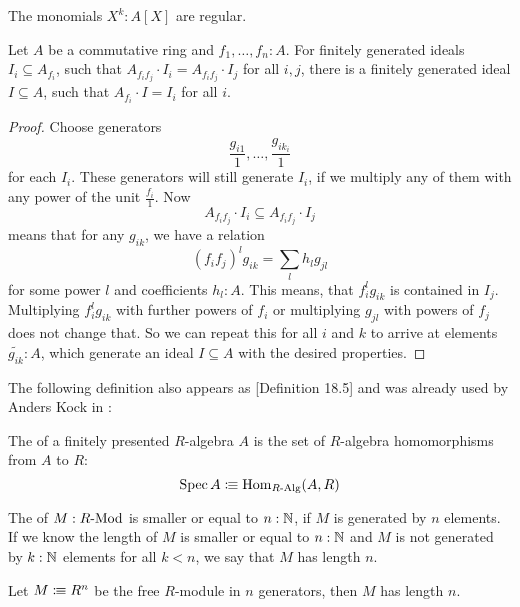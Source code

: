 \begin{example}
  The monomials $X^k:A[X]$ are regular.
\end{example}

\begin{lemma}%
  \label{fg-ideal-local-global}
  Let $A$ be a commutative ring and $f_1,\dots,f_n:A$.
  For finitely generated ideals $I_i\subseteq A_{f_i}$,
  such that $A_{f_if_j}\cdot I_i=A_{f_if_j}\cdot I_j$ for all $i,j$,
  there is a finitely generated ideal $I\subseteq A$,
  such that $A_{f_i}\cdot I=I_i$ for all $i$.
\end{lemma}

\begin{proof}
  Choose generators 
  \[ \frac{g_{i1}}{1},\dots,\frac{g_{ik_i}}{1} \]
  for each $I_i$.
  These generators will still generate $I_i$, if we multiply any of them with any power of the unit $\frac{f_i}{1}$.
  Now
  \[ A_{f_if_j}\cdot I_i\subseteq A_{f_if_j}\cdot I_j \]
  means that for any $g_{ik}$, we have a relation
  \[ (f_if_j)^l g_{ik}=\sum_{l}h_{l}g_{jl}\]
  for some power $l$ and coefficients $h_{l}:A$.
  This means, that $f_i^lg_{ik}$ is contained in $I_j$.
  Multiplying $f_i^lg_{ik}$ with further powers of $f_i$ or multiplying $g_{jl}$ with powers of $f_j$ does not change that.
  So we can repeat this for all $i$ and $k$ to arrive at elements $\tilde{g_{ik}}:A$,
  which generate an ideal $I\subseteq A$ with the desired properties.
\end{proof}

The following definition also appears as \cite{ingo-thesis}[Definition 18.5]
and was already used by Anders Kock in \cite{MISSING}:

\begin{definition}
  \label{spec}
  The  of a finitely presented $R$-algebra $A$
  is the set of $R$-algebra homomorphisms from $A$ to $R$:
  \[ \operatorname{Spec} A \vcentcolon\mspace{-1.2mu}\equiv \mathrm{Hom}_{R\text{-}\mathrm{Alg}}(A, R) \]
\end{definition}

\begin{definition}
  \label{length-of-module}
  The  of $M:R\text{-}\mathrm{Mod}$ is smaller or equal to $n:\mathbb{N}$,
  if $M$ is generated by $n$ elements.
  If we know the length of $M$ is smaller or equal to $n:\mathbb{N}$ and $M$ is not generated by $k:\mathbb{N}$ elements for all $k<n$,
  we say that $M$ has length $n$.
\end{definition}

\begin{example}
  Let $M\vcentcolon\mspace{-1.2mu}\equiv R^n$ be the free $R$-module in $n$ generators,
  then $M$ has length $n$.
\end{example}

